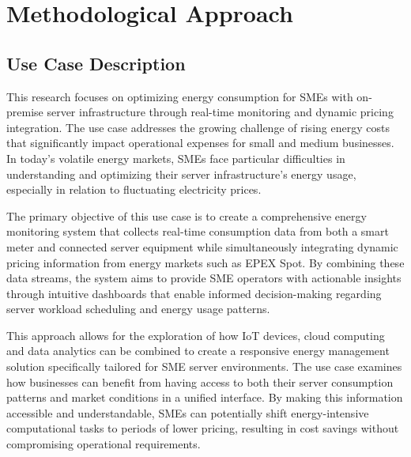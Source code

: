

\section{Methodological Approach}

\subsection{Use Case Description}
This research focuses on optimizing energy consumption for SMEs with on-premise server infrastructure
through real-time monitoring and dynamic pricing integration. The use case addresses the growing
challenge of rising energy costs that significantly impact operational expenses for small and medium
businesses. In today's volatile energy markets, SMEs face particular difficulties in understanding
and optimizing their server infrastructure's energy usage, especially in relation to fluctuating
electricity prices.

The primary objective of this use case is to create a comprehensive energy monitoring system that
collects real-time consumption data from both a smart meter and connected server equipment while
simultaneously integrating dynamic pricing information from energy markets such as EPEX Spot.
By combining these data streams, the system aims to provide SME operators with actionable insights
through intuitive dashboards that enable informed decision-making regarding server workload
scheduling and energy usage patterns.

This approach allows for the exploration of how IoT devices, cloud computing and data analytics can
be combined to create a responsive energy management solution specifically tailored for SME server
environments. The use case examines how businesses can benefit from having access to both their
server consumption patterns and market conditions in a unified interface. By making this
information accessible and understandable, SMEs can potentially shift energy-intensive computational
tasks to periods of lower pricing, resulting in cost savings without compromising operational
requirements.


